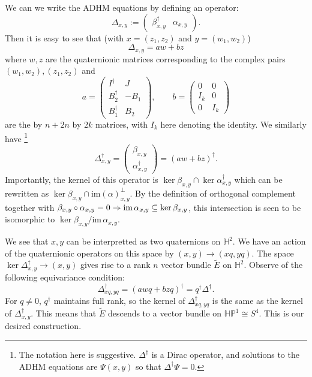 	We can we write the ADHM equations by defining an operator:
	\begin{equation}
		\Delta_{x,y} := \begin{pmatrix}
			\beta^\dagger_{x,y} & \alpha_{x,y}
		\end{pmatrix}.
	\end{equation}
	Then it is easy to see that (with $x=(z_1, z_2)$ and $y=(w_1, w_2)$)
	\begin{equation}
		\Delta_{x, y} = a w + b z
	\end{equation}
	where $w, z$ are the quaternionic matrices corresponding to the complex pairs $(w_1, w_2), (z_1, z_2)$ and 
	\begin{equation}
		a = \begin{pmatrix}
			I^\dagger & J\\
			B_2^\dagger & -B_1\\
			B_1^\dagger & B_2
		\end{pmatrix}, \qquad b = \begin{pmatrix}
			0 & 0\\
			I_k & 0\\
			0 & I_k
		\end{pmatrix}
	\end{equation}
	are the by $n+ 2n$ by $2k$ matrices, with $I_k$ here denoting the identity. We similarly have \footnote{The notation here is suggestive. $\Delta^\dagger$ is a Dirac operator, and solutions to the ADHM equations are $\Psi(x,y)$ so that $\Delta^\dagger \Psi = 0$.}
	\begin{equation}
		\Delta^\dagger_{x,y} = \begin{pmatrix}
			\beta_{x,y}\\
			\alpha^\dagger_{x,y}
		\end{pmatrix} =
		(a w  + b z)^\dagger.
	\end{equation}
	Importantly, the kernel of this operator is $\ker \beta_{x,y} \cap \ker \alpha^\dagger_{x,y}$ which can be rewritten as $\ker \beta_{x,y} \cap \mathrm{im}(\alpha)^\perp_{x,y}$. By the definition of orthogonal complement together with $\beta_{x,y} \circ \alpha_{x,y} = 0 \Rightarrow \mathrm{im}\, \alpha_{x,y} \subseteq \ker \beta_{x,y}$, this intersection is seen to be isomorphic to $\ker \beta_{x,y} / \mathrm{im}\, \alpha_{x,y}$.
	
	We see that $x, y$ can be interpretted as two quaternions on $\mathbb H^2$. We have an action of the quaternionic operators on this space by $(x, y) \to (x q, y q)$. The space $\ker \Delta^\dagger_{x, y} \to (x, y)$ gives rise to a rank $n$ vector bundle $\tilde E$ on $\mathbb H^2$. Observe of the following equivariance condition:
	\begin{equation}
		\Delta^\dagger_{xq, yq} = (a w q + b z q)^\dagger = q^\dagger \Delta^\dagger.
	\end{equation}
	For $q \neq 0$, $q^\dagger$ maintains full rank, so the kernel of $\Delta^\dagger_{xq, yq}$ is the same as the kernel of $\Delta^\dagger_{x,y}$. This means that $\tilde E$ descends to a vector bundle on $\mathbb{HP}^1 \cong S^4$. This is our desired construction.
	

